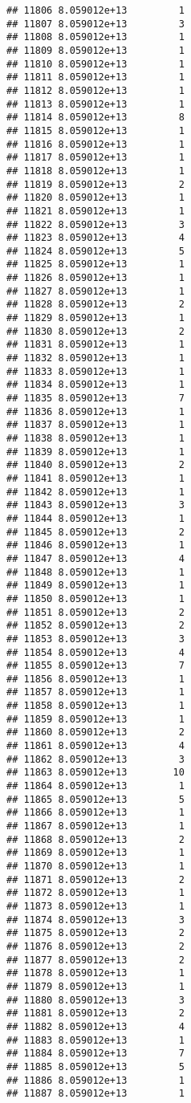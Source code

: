 \documentclass[
]{article}
\begin{document}
\begin{verbatim}
## 11806 8.059012e+13         1
## 11807 8.059012e+13         3
## 11808 8.059012e+13         1
## 11809 8.059012e+13         1
## 11810 8.059012e+13         1
## 11811 8.059012e+13         1
## 11812 8.059012e+13         1
## 11813 8.059012e+13         1
## 11814 8.059012e+13         8
## 11815 8.059012e+13         1
## 11816 8.059012e+13         1
## 11817 8.059012e+13         1
## 11818 8.059012e+13         1
## 11819 8.059012e+13         2
## 11820 8.059012e+13         1
## 11821 8.059012e+13         1
## 11822 8.059012e+13         3
## 11823 8.059012e+13         4
## 11824 8.059012e+13         5
## 11825 8.059012e+13         1
## 11826 8.059012e+13         1
## 11827 8.059012e+13         1
## 11828 8.059012e+13         2
## 11829 8.059012e+13         1
## 11830 8.059012e+13         2
## 11831 8.059012e+13         1
## 11832 8.059012e+13         1
## 11833 8.059012e+13         1
## 11834 8.059012e+13         1
## 11835 8.059012e+13         7
## 11836 8.059012e+13         1
## 11837 8.059012e+13         1
## 11838 8.059012e+13         1
## 11839 8.059012e+13         1
## 11840 8.059012e+13         2
## 11841 8.059012e+13         1
## 11842 8.059012e+13         1
## 11843 8.059012e+13         3
## 11844 8.059012e+13         1
## 11845 8.059012e+13         2
## 11846 8.059012e+13         1
## 11847 8.059012e+13         4
## 11848 8.059012e+13         1
## 11849 8.059012e+13         1
## 11850 8.059012e+13         1
## 11851 8.059012e+13         2
## 11852 8.059012e+13         2
## 11853 8.059012e+13         3
## 11854 8.059012e+13         4
## 11855 8.059012e+13         7
## 11856 8.059012e+13         1
## 11857 8.059012e+13         1
## 11858 8.059012e+13         1
## 11859 8.059012e+13         1
## 11860 8.059012e+13         2
## 11861 8.059012e+13         4
## 11862 8.059012e+13         3
## 11863 8.059012e+13        10
## 11864 8.059012e+13         1
## 11865 8.059012e+13         5
## 11866 8.059012e+13         1
## 11867 8.059012e+13         1
## 11868 8.059012e+13         2
## 11869 8.059012e+13         1
## 11870 8.059012e+13         1
## 11871 8.059012e+13         2
## 11872 8.059012e+13         1
## 11873 8.059012e+13         1
## 11874 8.059012e+13         3
## 11875 8.059012e+13         2
## 11876 8.059012e+13         2
## 11877 8.059012e+13         2
## 11878 8.059012e+13         1
## 11879 8.059012e+13         1
## 11880 8.059012e+13         3
## 11881 8.059012e+13         2
## 11882 8.059012e+13         4
## 11883 8.059012e+13         1
## 11884 8.059012e+13         7
## 11885 8.059012e+13         5
## 11886 8.059012e+13         1
## 11887 8.059012e+13         1

\end{verbatim}
\end{document}
